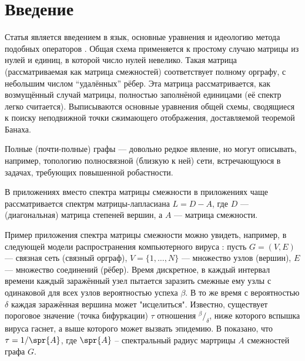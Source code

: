 \section{Введение}

Статья является введением в язык, основные уравнения и идеологию
метода подобных операторов \cite{baskakov-harmonic}.
Общая схема применяется к простому случаю матрицы из нулей и единиц,
в которой число нулей невелико.
Такая матрица (рассматриваемая как матрица смежностей)
соответствует полному орграфу, с небольшим числом ``удалённых'' рёбер.
Эта матрица рассматривается, как возмущённый случай матрицы,
полностью заполнёной единицами (её спектр легко считается).
Выписываются основные уравнения общей схемы,
сводящиеся к поиску неподвижной точки сжимающего отображения,
доставляемой теоремой Банаха.

Полные (почти-полные) графы --- довольно редкое явление,
но могут описывать, например, топологию полносвязной (близкую к ней) сети,
встречающуюся в задачах, требующих повышенной робастности.

В приложениях вместо спектра матрицы смежности в приложениях чаще рассматривается
спектрм матрицы-лапласиана \( L = D - A \),
где \( D \) --- (диагональная) матрица степеней вершин,
а \( A \) --- матрица смежности.

Пример приложения спектра матрицы смежности можно увидеть, например,
в следующей модели распространения компьютерного вируса \cite{epidemic-eigenvalues}:
пусть \( G = (V, E) \) --- связная сеть (связный орграф),
\( V = \{1, \ldots, N\} \) --- множество узлов (вершин),
\( E \) --- множество соединений (рёбер).
Время дискретное, в каждый интервал времени каждый заражённый узел
пытается заразить смежные ему узлы с одинаковой для всех узлов вероятностью успеха \( \beta \).
В то же время с вероятностью \( \delta \) каждая заражённая вершина может "исцелиться".
Известно, существует пороговое значение (точка бифуркации) \( \tau \) отношения \( {^\beta}/_{\delta} \),
ниже которого вспышка вируса гаснет, а выше которого может вызвать эпидемию.
В \cite{epidemic-eigenvalues} показано, что \( \tau = 1/\spr{A} \),
где \( \spr{A} \) -- спектральный радиус мартрицы \( A \) смежностей графа \( G \).
